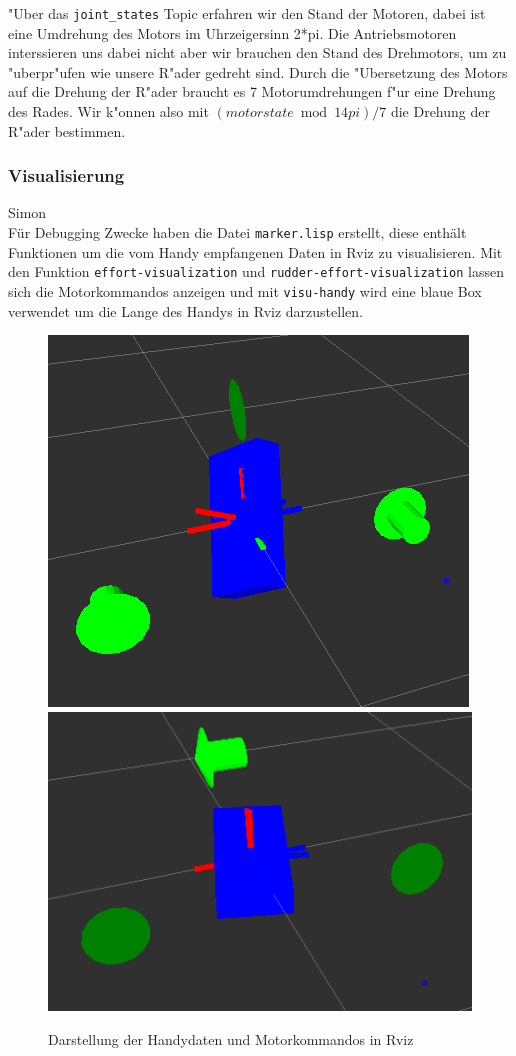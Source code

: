 \documentclass[8pt]{article}
\begin{document}
"Uber das \texttt{joint\_states} Topic erfahren wir den Stand der Motoren, dabei ist eine Umdrehung des Motors im Uhrzeigersinn 2*pi. Die Antriebsmotoren interssieren uns dabei nicht aber wir brauchen den Stand des Drehmotors, um zu "uberpr"ufen wie unsere R"ader gedreht sind. Durch die "Ubersetzung des Motors auf die Drehung der R"ader braucht es 7 Motorumdrehungen f"ur eine Drehung des Rades. Wir k"onnen also mit 
\( (motorstate \bmod 14pi) / 7 \) die Drehung der R"ader bestimmen.

\subsubsection{Visualisierung} Simon\\
Für Debugging Zwecke haben die Datei \texttt{marker.lisp} erstellt, diese enthält Funktionen um die vom Handy empfangenen Daten in Rviz zu visualisieren. Mit den Funktion \texttt{effort-visualization} und \texttt{rudder-effort-visualization} lassen sich die Motorkommandos anzeigen und mit \texttt{visu-handy} wird eine blaue Box verwendet um die Lange des Handys in Rviz darzustellen.
\begin{figure}[h]
  \begin{center}
    \includegraphics[width=.4\textwidth]{pictures/rviz2.png}
    \includegraphics[width=.5\textwidth]{pictures/rviz1.png}    
  \end{center}
  \caption{Darstellung der Handydaten und Motorkommandos in Rviz}
  \label{fig:pancake}
\end{figure}

\end{document}

